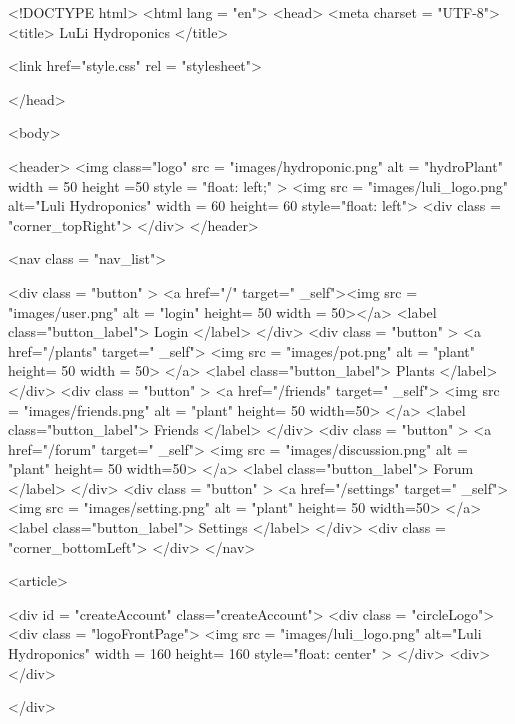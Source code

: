 \documentclass[12pt]{article} %
\begin{document}
    \begin{htmlcode}[caption={Create Account HTML}]
    <!DOCTYPE html>
    <html lang = "en">
    <head>
    <meta charset = "UTF-8">
    <title> LuLi Hydroponics </title>
    
    <link href="style.css" 
          rel = "stylesheet">
    
    </head>
    
    <body>
     
       <header>
          <img class="logo" src = "images/hydroponic.png" alt = "hydroPlant"  width = 50 height =50 style = "float: left;" >   
          <img src = "images/luli_logo.png" alt="Luli Hydroponics" width = 60 height= 60 style="float: left">
          <div class = "corner_topRight"> </div>
       </header>
    
       <nav class = "nav_list">
          
        <div class = "button" > 
           <a href="/" target=" _self"><img src = "images/user.png" alt = "login" height= 50 width = 50></a>
           <label class="button_label"> Login </label> 
        </div>
        <div class = "button" > 
           <a href="/plants" target=" _self"> <img src = "images/pot.png" alt = "plant" height= 50 width = 50> </a>
           <label class="button_label"> Plants </label> 
        </div>
        <div class = "button" > 
           <a href="/friends" target=" _self"> <img src = "images/friends.png" alt = "plant" height= 50 width=50> </a>
           <label class="button_label"> Friends </label> 
        </div>
        <div class = "button" > 
           <a href="/forum" target=" _self"> <img src = "images/discussion.png" alt = "plant" height= 50 width=50> </a>
           <label class="button_label"> Forum </label> 
        </div>
        <div class = "button" > 
           <a href="/settings" target=" _self"> <img src = "images/setting.png" alt = "plant" height= 50 width=50> </a>
           <label class="button_label"> Settings </label> 
        </div>
           <div class = "corner_bottomLeft"> </div>
       </nav>
         
    <article>
          
          <div id = "createAccount" class="createAccount">
            <div class = "circleLogo">
                <div class = "logoFrontPage">
                    <img src = "images/luli_logo.png" alt="Luli Hydroponics" width = 160 height= 160 style="float: center" >
                </div>
                <div></div>
    
            </div>
    

\end{htmlcode}
\end{document}
